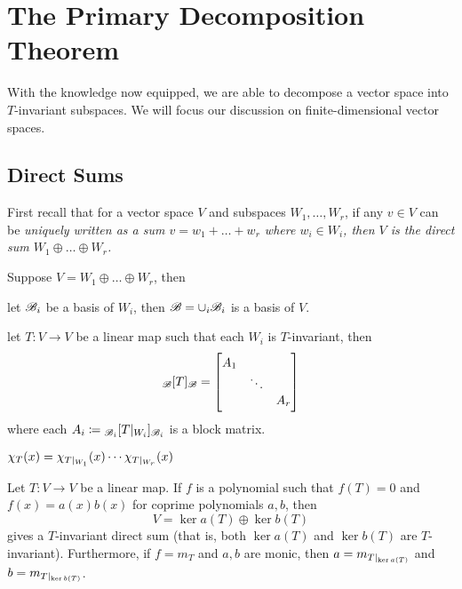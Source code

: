 \documentclass{styles/tufte}
\begin{document}
\section{The Primary Decomposition Theorem}

With the knowledge now equipped, we are able to decompose a vector space into $T$-invariant subspaces. We will focus our discussion on finite-dimensional vector spaces.


\subsection{Direct Sums}

  First recall that for a vector space $V$ and subspaces $W_1, \dots, W_r$, if any $v \in V$ can be \em{uniquely} written as a sum $v = w_1 + \dots + w_r$ where $w_i \in W_i$, then $V$ is the direct sum $W_1 \oplus \dots \oplus W_r$.
  
  \begin{proposition}{}{}
    Suppose $V = W_1 \oplus \dots \oplus W_r$, then
    \begin{romanenum}
      \item let $\mathscr{B}_i$ be a basis of $W_i$, then $\mathscr{B} = \cup_i \mathscr{B}_i$ is a basis of $V$.
      \item let $T: V \to V$ be a linear map such that each $W_i$ is $T$-invariant, then
        \[ {}_{\mathscr{B}}[T]_{\mathscr{B}} = \begin{bmatrix}
          A_1 & & \\
          & \ddots & \\
          & & A_r
        \end{bmatrix} \]
        where each $A_i \coloneqq {}_{\mathscr{B}_i}[T |_{W_i}]_{\mathscr{B}_i}$ is a block matrix.
      \item $\chi_T(x) = \chi_{T|_{W_1}}(x) \cdots \chi_{T|_{W_r}}(x)$
    \end{romanenum}
  \end{proposition}
  
  \begin{proposition}{}{}
    Let $T: V \to V$ be a linear map. If $f$ is a polynomial such that $f(T) = 0$ and $f(x) = a(x) b(x)$ for coprime polynomials $a, b$, then
    \[ V = \ker a(T) \oplus \ker b(T) \]
    gives a $T$-invariant direct sum (that is, both $\ker a(T)$ and $\ker b(T)$ are $T$-invariant). Furthermore, if $f = m_T$ and $a, b$ are monic, then $a = m_{T|_{\ker a(T)}}$ and $b = m_{T|_{\ker b(T)}}$.
  \end{proposition}
\end{document}
